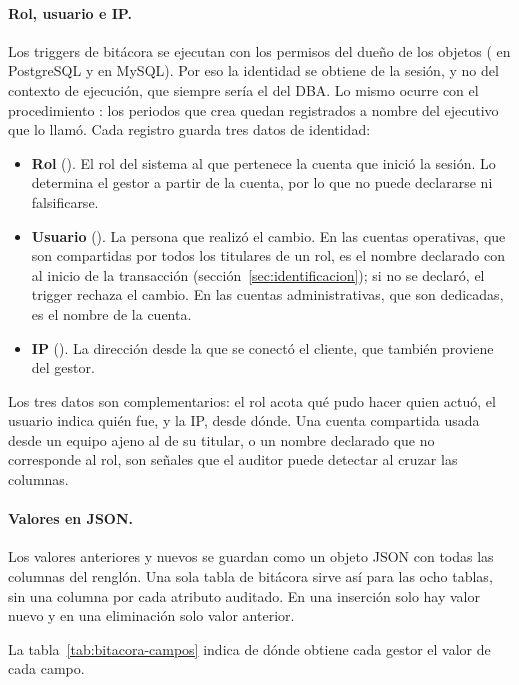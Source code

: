 \paragraph{Rol, usuario e IP.} Los triggers de bitácora se ejecutan con los permisos del dueño de los objetos ( en PostgreSQL y  en MySQL). Por eso la identidad se obtiene de la sesión, y no del contexto de ejecución, que siempre sería el del DBA. Lo mismo ocurre con el procedimiento : los periodos que crea quedan registrados a nombre del ejecutivo que lo llamó. Cada registro guarda tres datos de identidad:
\begin{itemize}
	\item \textbf{Rol} (). El rol del sistema al que pertenece la cuenta que inició la sesión. Lo determina el gestor a partir de la cuenta, por lo que no puede declararse ni falsificarse.
	\item \textbf{Usuario} (). La persona que realizó el cambio. En las cuentas operativas, que son compartidas por todos los titulares de un rol, es el nombre declarado con  al inicio de la transacción (sección~\ref{sec:identificacion}); si no se declaró, el trigger rechaza el cambio. En las cuentas administrativas, que son dedicadas, es el nombre de la cuenta.
	\item \textbf{IP} (). La dirección desde la que se conectó el cliente, que también proviene del gestor.
\end{itemize}
Los tres datos son complementarios: el rol acota qué pudo hacer quien actuó, el usuario indica quién fue, y la IP, desde dónde. Una cuenta compartida usada desde un equipo ajeno al de su titular, o un nombre declarado que no corresponde al rol, son señales que el auditor puede detectar al cruzar las columnas.

\paragraph{Valores en JSON.} Los valores anteriores y nuevos se guardan como un objeto JSON con todas las columnas del renglón. Una sola tabla de bitácora sirve así para las ocho tablas, sin una columna por cada atributo auditado. En una inserción solo hay valor nuevo y en una eliminación solo valor anterior.

La tabla~\ref{tab:bitacora-campos} indica de dónde obtiene cada gestor el valor de cada campo.

